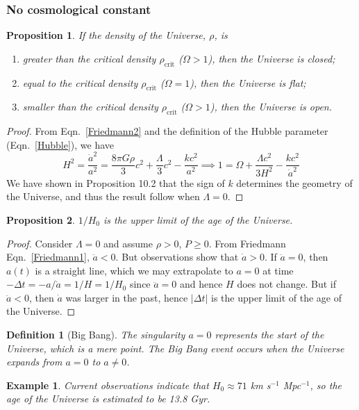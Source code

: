 \documentclass[a4paper]{article}
\newtheorem{eg}{Example}[section]
\theoremstyle{new}
\newtheorem{defi}{Definition}[section]
\newtheorem{prop}{Proposition}[section]
\begin{document}
\subsubsection{No cosmological constant}
\begin{prop}
If the density of the Universe, $\rho$, is
\begin{enumerate}
    \item greater than the critical density $\rho_{\text{crit}}$ ($\Omega>1$), then the Universe is closed;
    \item equal to the critical density $\rho_{\text{crit}}$ ($\Omega=1$), then the Universe is flat;
    \item smaller than the critical density $\rho_{\text{crit}}$ ($\Omega>1$), then the Universe is open.
\end{enumerate}
\end{prop}
\begin{proof}
From Eqn.~\ref{Friedmann2} and the definition of the Hubble parameter (Eqn.~\ref{Hubble}), we have
$$H^2=\frac{\dot{a}^2}{a^2}=\frac{8\pi G \rho}{3}c^2+\frac{\Lambda}{3}c^2-\frac{kc^2}{a^2}\implies 1=\Omega+\frac{\Lambda c^2}{3H^2}-\frac{kc^2}{\dot{a}^2}$$
We have shown in Proposition 10.2 that the sign of $k$ determines the geometry of the Universe, and thus the result follow when $\Lambda=0$.
\end{proof}
\begin{prop}
$1/H_0$ is the upper limit of the age of the Universe.
\end{prop}
\begin{proof}
Consider $\Lambda=0$ and assume $\rho>0$, $P\geq 0$. From Friedmann Eqn.~\ref{Friedmann1}, $\ddot{a}<0$. But observations show that $\dot{a}>0$. If $\ddot{a}=0$, then $a(t)$ is a straight line, which we may extrapolate to $a=0$ at time $-\Delta t=-a/\dot{a}=1/H=1/H_0$ since $\ddot{a}=0$ and hence $H$ does not change. But if $\ddot{a}<0$, then $\dot{a}$ was larger in the past, hence $|\Delta t|$ is the upper limit of the age of the Universe. 
\end{proof}
\begin{defi}[Big Bang]
The singularity $a=0$ represents the start of the Universe, which is a mere point. The Big Bang event occurs when the Universe expands from $a=0$ to $a\neq 0$.
\end{defi}
\begin{eg}
Current observations indicate that $H_0\approx 71$ km s$^{-1}$ Mpc$^{-1}$, so the age of the Universe is estimated to be 13.8 Gyr.
\end{eg}
\end{document}
